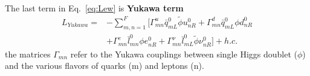 The last term in Eq.~\ref{eq:Lew} is \textbf{Yukawa term}
\begin{equation}
\begin{split}
	{L}_{Yukawa} =& -\sum_{m,n=1}^{F} [\Gamma_{mn}^{u}\bar{q}_{mL}^{0}\widetilde{\phi}u_{nR}^{0} + \Gamma_{mn}^{d}\bar{q}_{mL}^{0}\phi d_{nR}^{0} \\
	& + \Gamma_{mn}^{e}\bar{l}_{mn}^{0}\phi e_{nR}^{0} + \Gamma_{mn}^{\nu}\bar{l}_{mL}^{0}\widetilde{\phi}\nu_{nR}^{0}]+h.c.
\end{split}
\end{equation}
the matrices $\Gamma_{mn}$ refer to the Yukawa couplings between single Higgs doublet ($\phi$) and the various flavors of quarks (m) and leptons (n).

